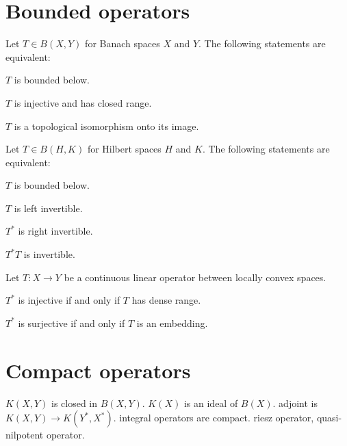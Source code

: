 \documentclass{../../large}
\begin{document}
\section{Bounded operators}
\begin{prb}
Let $T\in B(X,Y)$ for Banach spaces $X$ and $Y$.
The following statements are equivalent:
\begin{parts}
\item $T$ is bounded below.
\item $T$ is injective and has closed range.
\item $T$ is a topological isomorphism onto its image.
\end{parts}
\end{prb}

\begin{prb}
Let $T\in B(H,K)$ for Hilbert spaces $H$ and $K$.
The following statements are equivalent:
\begin{parts}
\item $T$ is bounded below.
\item $T$ is left invertible.
\item $T^*$ is right invertible.
\item $T^*T$ is invertible.
\end{parts}
\end{prb}

\begin{prb}
Let $T:X\to Y$ be a continuous linear operator between locally convex spaces.
\begin{parts}
\item $T^*$ is injective if and only if $T$ has dense range.
\item $T^*$ is surjective if and only if $T$ is an embedding.
\end{parts}
\end{prb}








\section{Compact operators}

$K(X,Y)$ is closed in $B(X,Y)$.
$K(X)$ is an ideal of $B(X)$.
adjoint is $K(X,Y)\to K(Y^*,X^*)$.
integral operators are compact.
riesz operator, quasi-nilpotent operator.
\end{document}
